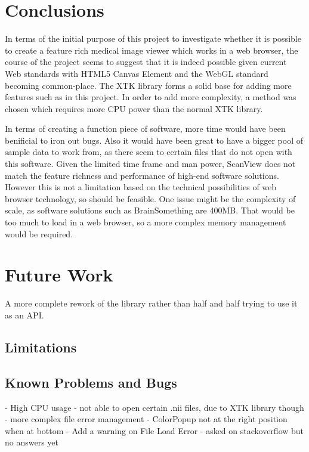 \documentclass[a4paper,11pt,titlepage]{article}
\begin{document}
\section{Conclusions}

In terms of the initial purpose of this project to investigate whether it is possible to create a feature rich medical image viewer which works in a web browser, the course of the project seems to suggest that it is indeed possible given current Web standards with HTML5 Canvas Element and the WebGL standard becoming common-place. The XTK library forms a solid base for adding more features such as in this project. In order to add more complexity, a method was chosen which requires more CPU power than the normal XTK library.

In terms of creating a function piece of software, more time would have been benificial to iron out bugs. Also it would have been great to have a bigger pool of sample data to work from, as there seem to certain files that do not open with this software. Given the limited time frame and man power, ScanView does not match the feature richness and performance of high-end software solutions. However this is not a limitation based on the technical possibilities of web browser technology, so should be feasible. One issue might be the complexity of scale, as software solutions such as BrainSomething are 400MB. That would be too much to load in a web browser, so a more complex memory management would be required.




\section{Future Work}

A more complete rework of the library rather than half and half trying to use it as an API.

\subsection{Limitations}


\subsection{Known Problems and Bugs}

- High CPU usage
- not able to open certain .nii files, due to XTK library though
- more complex file error management
- ColorPopup not at the right position when at bottom
- Add  a warning on File Load Error - asked on stackoverflow but no answers yet
\end{document}
